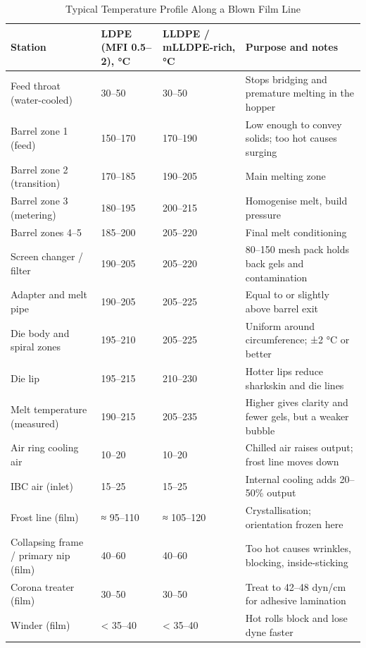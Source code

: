 \documentclass[10pt,twocolumn,a4paper]{article}
\begin{document}
\begin{table}[!t]
\caption{Typical Temperature Profile Along a Blown Film Line}
\label{tab:temp}
\footnotesize
\begin{tabularx}{\textwidth}{@{}p{50mm}p{30mm}p{32mm}L@{}}
\toprule
\textbf{Station} & \textbf{LDPE (MFI 0.5–2), °C} & \textbf{LLDPE / mLLDPE-rich, °C} & \textbf{Purpose and notes}\\
\midrule
Feed throat (water-cooled) & 30–50 & 30–50 & Stops bridging and premature melting in the hopper\\
Barrel zone 1 (feed) & 150–170 & 170–190 & Low enough to convey solids; too hot causes surging\\
Barrel zone 2 (transition) & 170–185 & 190–205 & Main melting zone\\
Barrel zone 3 (metering) & 180–195 & 200–215 & Homogenise melt, build pressure\\
Barrel zones 4–5 & 185–200 & 205–220 & Final melt conditioning\\
Screen changer / filter & 190–205 & 205–220 & 80–150 mesh pack holds back gels and contamination\\
Adapter and melt pipe & 190–205 & 205–225 & Equal to or slightly above barrel exit\\
Die body and spiral zones & 195–210 & 205–225 & Uniform around circumference; ±2 °C or better\\
Die lip & 195–215 & 210–230 & Hotter lips reduce sharkskin and die lines\\
Melt temperature (measured) & 190–215 & 205–235 & Higher gives clarity and fewer gels, but a weaker bubble\\
Air ring cooling air & 10–20 & 10–20 & Chilled air raises output; frost line moves down\\
IBC air (inlet) & 15–25 & 15–25 & Internal cooling adds 20–50\% output\\
Frost line (film) & ≈ 95–110 & ≈ 105–120 & Crystallisation; orientation frozen here\\
Collapsing frame / primary nip (film) & 40–60 & 40–60 & Too hot causes wrinkles, blocking, inside-sticking\\
Corona treater (film) & 30–50 & 30–50 & Treat to 42–48 dyn/cm for adhesive lamination\\
Winder (film) & < 35–40 & < 35–40 & Hot rolls block and lose dyne faster\\
\bottomrule
\end{tabularx}
\end{table}
\end{document}
